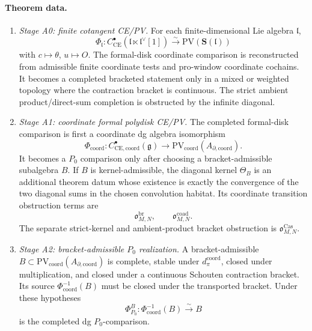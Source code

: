 \medskip
\paragraph{Theorem data.}

\begin{enumerate}
  \item \emph{Stage A0: finite cotangent CE/PV.}
  For each finite-dimensional Lie algebra \(\mathfrak l\),
  \[
    \Phi_{\mathfrak l}\colon
    C^\bullet_{\mathrm{CE}}
      (\mathfrak l\ltimes \mathfrak l^\vee[1])
    \xrightarrow{\sim}
    \mathrm{PV}(\mathbf S(\mathfrak l))
  \]
  with \(c\mapsto\theta\), \(u\mapsto O\).  The formal-disk coordinate
  comparison is reconstructed from admissible finite coordinate tests and
  pro-window coordinate cochains.  It becomes a completed bracketed
  statement only in a mixed or weighted topology where the contraction
  bracket is continuous.  The strict ambient product/direct-sum
  completion is obstructed by the infinite diagonal.

  \item \emph{Stage A1: coordinate formal polydisk CE/PV.}
  The completed formal-disk comparison is first a coordinate dg algebra
  isomorphism
  \[
    \Phi_{\mathrm{coord}}\colon
    C^\bullet_{\mathrm{CE},\mathrm{coord}}(\mathfrak g)
    \longrightarrow
    \mathrm{PV}_{\mathrm{coord}}(A_{\partial,\mathrm{coord}}).
  \]
  It becomes a \(P_0\) comparison only after choosing a
  bracket-admissible subalgebra \(B\).  If \(B\) is kernel-admissible, the
  diagonal kernel \(\Theta_B\) is an additional theorem datum whose
  existence is exactly the convergence of the two diagonal sums in the
  chosen convolution habitat.
  Its coordinate transition obstruction terms are
  \[
    \mathfrak o^{\mathrm{br}}_{M,N},\qquad
    \mathfrak o^{\mathrm{coad}}_{M,N}.
	  \]
	  The separate strict-kernel and ambient-product bracket obstruction is
	  \(\mathfrak o^{\mathrm{Cas}}_{M,N}\).

  \item \emph{Stage A2: bracket-admissible \(P_0\) realization.}
  A bracket-admissible \(B\subset
  \mathrm{PV}_{\mathrm{coord}}(A_{\partial,\mathrm{coord}})\) is complete,
  stable under \(d_\pi^{\mathrm{coord}}\), closed under multiplication, and closed under a
  continuous Schouten contraction bracket.  Its source
  \(\Phi_{\mathrm{coord}}^{-1}(B)\) must be closed under the transported
  bracket.  Under these hypotheses
  \[
    \Phi^B_{P_0}\colon\Phi_{\mathrm{coord}}^{-1}(B)
    \xrightarrow{\sim}B
  \]
  is the completed dg \(P_0\)-comparison.


\end{enumerate}
